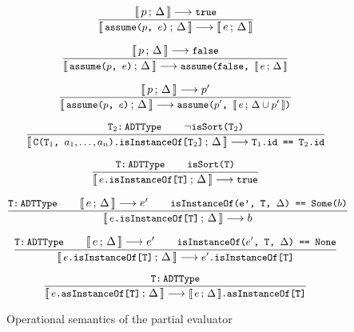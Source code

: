 \begin{figure}[htb]
\begin{framed}
\begin{equation}
\dfrac{
  \llbracket\, p\,;\, \Delta\, \rrbracket \longrightarrow \texttt{\small{true}}
}{
  \llbracket\, \texttt{\small{assume($p$, $e$)}}\,;\, \Delta\, \rrbracket \longrightarrow \llbracket\, e\,;\, \Delta\, \rrbracket
}
\end{equation}

\begin{equation}
\dfrac{
  \llbracket\, p\,;\, \Delta\, \rrbracket \longrightarrow \texttt{\small{false}}
}{
  \llbracket\, \texttt{\small{assume($p$, $e$)}}\,;\, \Delta\, \rrbracket \longrightarrow
  \texttt{\small{assume(false, $\llbracket\, e\,;\, \Delta\, \rrbracket$}}
}
\end{equation}

\begin{equation}
\dfrac{
  \llbracket\, p\,;\, \Delta\, \rrbracket \longrightarrow p'
}{
  \llbracket\, \texttt{\small{assume($p$, $e$)}}\,;\, \Delta\, \rrbracket \longrightarrow
  \texttt{\small{assume($p'$, $\llbracket\, e\,;\, \Delta \cup p'\, \rrbracket$)}}
}
\end{equation}

\begin{equation}
\dfrac{
  \texttt{\small{T$_2$:\,ADTType}} \qquad
  \neg \texttt{\small{isSort(T$_2$)}}
}{
  \llbracket\, \texttt{\small{C(T$_1$, $a_1, \ldots, a_n$).isInstanceOf[T$_2$]}}\,;\, \Delta\, \rrbracket
  \longrightarrow \texttt{\small{T$_1$.id == T$_2$.id}}
}
\end{equation}

\begin{equation}
\dfrac{
  \texttt{\small{T:\,ADTType}} \qquad
  \texttt{\small{isSort(T)}}
}{
  \llbracket\, \texttt{\small{$e$.isInstanceOf[T]}}\,;\, \Delta\, \rrbracket \longrightarrow \texttt{\small{true}}
}
\end{equation}

\begin{equation}
\dfrac{
  \texttt{\small{T:\,ADTType}} \qquad
  \llbracket\, e\,;\, \Delta\, \rrbracket \longrightarrow e' \qquad
  \texttt{\small{isInstanceOf(e', T, $\Delta$) == Some($b$)}}
}{
  \llbracket\, \texttt{\small{$e$.isInstanceOf[T]}}\,;\, \Delta\, \rrbracket \longrightarrow b
}
\end{equation}

\begin{equation}
\dfrac{
  \texttt{\small{T:\,ADTType}} \qquad
  \llbracket\, e\,;\, \Delta\, \rrbracket \longrightarrow e' \qquad
  \texttt{\small{isInstanceOf($e'$, T, $\Delta$) == None}}
}{
  \llbracket\, \texttt{\small{$e$.isInstanceOf[T]}}\,;\, \Delta\, \rrbracket \longrightarrow \texttt{\small{$e'$.isInstanceOf[T]}}
}
\end{equation}

\begin{equation}
\dfrac{
  \texttt{\small{T:\,ADTType}}
}{
  \llbracket\, \texttt{\small{$e$.asInstanceOf[T]}}\,;\, \Delta\, \rrbracket \longrightarrow \texttt{\small{$\llbracket\, e\,;\, \Delta\, \rrbracket$.asInstanceOf[T]}}
}
\end{equation}

\end{framed}
\vspace{-10pt}
\caption{Operational semantics of the partial evaluator \label{fig:partialsem}}
\end{figure}


